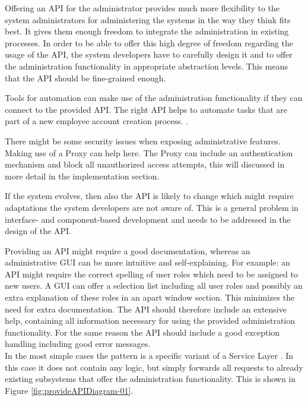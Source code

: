 

Offering an API for the administrator provides much more flexibility to the system administrators for administering the systems in the way they think fits best. It gives them enough freedom to integrate the administration in existing processes. In order to be able to offer this high degree of freedom regarding the usage of the API, the system developers have to carefully design it and to offer the administration functionality in appropriate abstraction levels. This means that the API should be fine-grained enough.

Tools for automation can make use of the administration functionality if they can connect to the provided API. The right API helps to automate tasks that are part of a new employee account creation process. \cite{Limoncelli2011a}.

There might be some security issues when exposing administrative features. Making use of a {\sc Proxy} \cite{Buschmann1996} can help here. The {\sc Proxy} can include an authentication mechanism and block all unauthorized access attempts, this will discussed in more detail in the implementation section.

If the system evolves, then also the API is likely to change which might require adaptations the system developers are not aware of. This is a general problem in interface- and component-based development and needs to be addressed in the design of the API. 

Providing an API might require a good documentation, whereas an administrative GUI can be more intuitive and self-explaining. For example: an API might require the correct spelling of user roles which need to be assigned to new users. A GUI can offer a selection list including all user roles and possibly an extra explanation of these roles in an apart window section. This minimizes the need for extra documentation. The API should therefore include an extensive help, containing all information necessary for using the provided administration functionality. For the same reason the API should include a good exception handling including good error messages. \\


In the most simple cases the pattern is a specific variant of a {\sc Service Layer} \cite{Fowler:2002:PEA:579257}. In this case it does not contain any logic, but simply forwards all requests to already existing subsystems that offer the administration functionality. This is shown in Figure \ref{fig:provideAPIDiagram-01}.  

